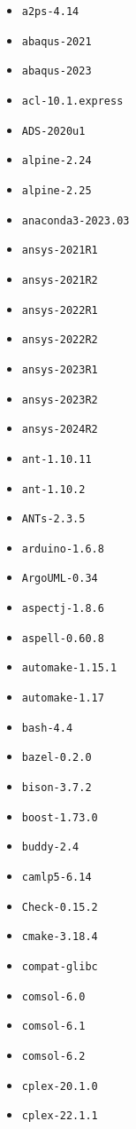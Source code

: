 \scriptsize
\begin{multicols}{3}
\begin{itemize}
\item \verb|a2ps-4.14|
\item \verb|abaqus-2021|
\item \verb|abaqus-2023|
\item \verb|acl-10.1.express|
\item \verb|ADS-2020u1|
\item \verb|alpine-2.24|
\item \verb|alpine-2.25|
\item \verb|anaconda3-2023.03|
\item \verb|ansys-2021R1|
\item \verb|ansys-2021R2|
\item \verb|ansys-2022R1|
\item \verb|ansys-2022R2|
\item \verb|ansys-2023R1|
\item \verb|ansys-2023R2|
\item \verb|ansys-2024R2|
\item \verb|ant-1.10.11|
\item \verb|ant-1.10.2|
\item \verb|ANTs-2.3.5|
\item \verb|arduino-1.6.8|
\item \verb|ArgoUML-0.34|
\item \verb|aspectj-1.8.6|
\item \verb|aspell-0.60.8|
\item \verb|automake-1.15.1|
\item \verb|automake-1.17|
\item \verb|bash-4.4|
\item \verb|bazel-0.2.0|
\item \verb|bison-3.7.2|
\item \verb|boost-1.73.0|
\item \verb|buddy-2.4|
\item \verb|camlp5-6.14|
\item \verb|Check-0.15.2|
\item \verb|cmake-3.18.4|
\item \verb|compat-glibc|
\item \verb|comsol-6.0|
\item \verb|comsol-6.1|
\item \verb|comsol-6.2|
\item \verb|cplex-20.1.0|
\item \verb|cplex-22.1.1|

\end{itemize}
\end{multicols}
